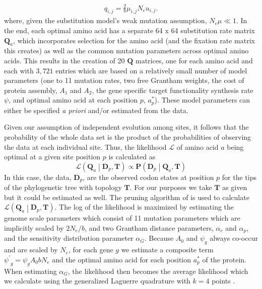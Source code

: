 \documentclass[12pt,letterpaper,fleqn]{article}
\newcommand{\Ne}{\ensuremath{{N_e}}\xspace} %
\newcommand{\Lik}{\ensuremath{\mathcal{L}}\xspace}%
\newcommand{\Pmatrix}{\ensuremath{\mathbf{P}}\xspace}
\newcommand{\Tmatrix}{\ensuremath{\mathbf{T}}\xspace}
\newcommand{\Dmatrixp}{\ensuremath{\mathbf{D}_p}\xspace}
\newcommand{\Qmatrix}{\ensuremath{\mathbf{Q}}\xspace}
\newcommand{\Qmatrixa}{\ensuremath{\Qmatrix_a}\xspace}
\newcommand{\alphac}{\ensuremath{\alpha_c}\xspace}
\newcommand{\alphag}{\ensuremath{\alpha_G}\xspace}
\newcommand{\alphap}{\ensuremath{\alpha_p}\xspace}
\newcommand{\aoptp}{\ensuremath{a^*_p}\xspace}
\newcommand{\muij}{\ensuremath{\mu_{i,j}}\xspace}
\newcommand{\psiprime}{\ensuremath{\psi^\prime}\xspace}
\begin{document}
\begin{align*}
  q_{i,j} = \frac{2}{b} \muij \Ne u_{i,j}.
\end{align*}
where, given the substitution model's weak mutation assumption, $\Ne \mu \ll 1$.
In the end, each optimal amino acid has a separate 64 x 64 substitution rate matrix \Qmatrixa, which incorporates selection for the amino acid (and the fixation rate matrix this creates) as well as the common mutation parameters across optimal amino acids.
This results in the creation of 20 \Qmatrix matrices, one for each amino acid and each with $3,721$ entries which are based on a relatively small number of model parameters (one to 11 mutation rates, two free Grantham weights, the cost of protein assembly, $A_1$ and $A_2$, the gene specific target functionality synthesis rate $\psi$, and optimal amino acid at each position $p$, \aoptp).
These model parameters can either be specified \emph{a priori} and/or estimated from the data.


Given our assumption of independent evolution among sites, it follows that the probability of the whole data set is the product of the probabilities of observing the data at each individual site.
Thus, the likelihood $\Lik$ of amino acid $a$ being optimal at a given site position $p$ is calculated as
\begin{equation}
\Lik\left(\Qmatrixa\middle| \Dmatrixp, \Tmatrix\right) \propto \Pmatrix\left(\Dmatrixp\middle|\Qmatrixa,\Tmatrix\right)
\end{equation}
In this case, the data, $\Dmatrixp$, are the observed codon states at position $p$ for the tips of the phylogenetic tree with topology $\Tmatrix$.
For our purposes we take \Tmatrix as given but it could be estimated as well.
The pruning algorithm of \citet{Felsenstein1981} is used to calculate $\Lik\left(\Qmatrixa \middle| \Dmatrixp, \Tmatrix\right)$.
The log of the likelihood is maximized by estimating the genome scale parameters which consist of 11 mutation parameters which are implicitly scaled by $2 \Ne/b$, and two Grantham distance parameters, $\alphac$ and $\alphap$, and the sensitivity distribution parameter \alphag.
Because $A_0$ and $\psi_g$ always co-occur and are scaled by \Ne, for each gene $g$ we estimate a composite term $\psiprime_g = \psi_g A_0 b \Ne$ and the optimal amino acid for each position \aoptp of the protein.
When estimating \alphag, the likelihood then becomes the average likelihood which we calculate using the generalized Laguerre quadrature with $k = 4$ points \citep{Felsenstein2001}.
\end{document}
